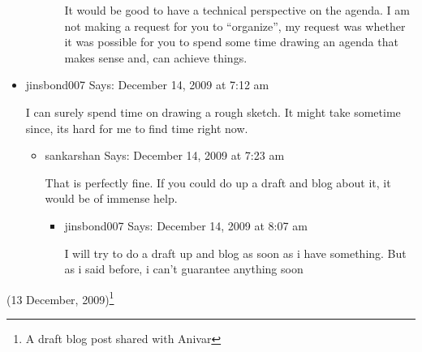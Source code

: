 \begin{english}
\begin{itemize}
\begin{itemize}
\begin{itemize}
        It would be good to have a technical perspective on the agenda. I am not making a request for you to “organize”, my request was whether it was possible for you to spend some time drawing an agenda that makes sense and, can achieve things.
	\end{itemize}
    \end{itemize}

\item jinsbond007 Says:
December 14, 2009 at 7:12 am

I can surely spend time on drawing a rough sketch.
It might take sometime since, its hard for me to find time right now.

    \begin{itemize}
    \item sankarshan Says:
    December 14, 2009 at 7:23 am

    That is perfectly fine. If you could do up a draft and blog about it, it would be of immense help.
	\begin{itemize}
        \item jinsbond007 Says:
        December 14, 2009 at 8:07 am

        I will try to do a draft up and blog as soon as i have something. But as i said before, i can’t guarantee anything soon
	\end{itemize}
    \end{itemize}
\end{itemize}
\begin{flushright}(13 December, 2009)\footnote{A draft blog post shared with Anivar}\end{flushright}
\end{english}
